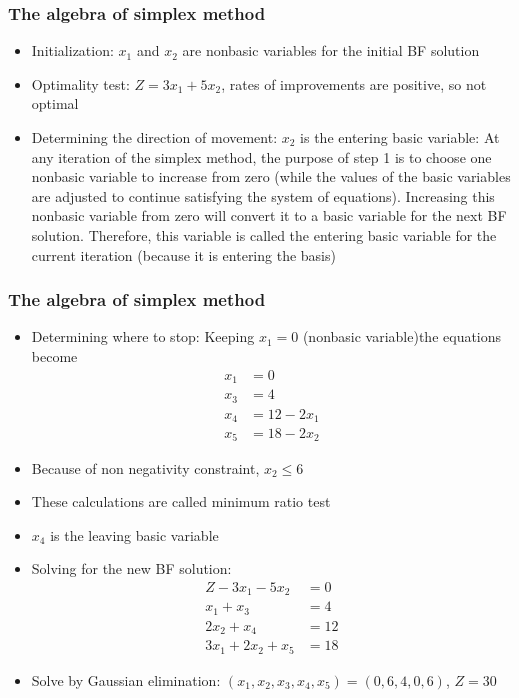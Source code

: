\documentclass[12pt]{article}
\begin{document}
  \subsubsection*{The algebra of simplex method}
  \begin{itemize}
  \item Initialization: $x_1$ and $x_2$ are nonbasic variables for the initial BF solution
  \item Optimality test: $Z=3 x_1 + 5 x_2$, rates of improvements are positive, so not optimal
  \item Determining the direction of movement: $x_2$ is the entering basic variable:
At any iteration of the simplex method, the purpose of step 1 is to choose one nonbasic
variable to increase from zero (while the values of the basic variables are adjusted to continue satisfying the system of equations). Increasing this nonbasic variable from zero will
convert it to a basic variable for the next BF solution. Therefore, this variable is called
the entering basic variable for the current iteration (because it is entering the basis)
  \end{itemize}


  \subsubsection*{The algebra of simplex method}
  \begin{itemize}
  \item Determining where to stop: Keeping $x_1=0$ (nonbasic variable)the equations become
    \begin{align*}
      x_1 &= 0 \\
      x_3 &= 4 \\
      x_4 &= 12 - 2 x_1 \\
      x_5 &= 18 - 2 x_2 
    \end{align*}
  \item Because of non negativity constraint, $x_2 \le 6$
  \item These calculations are called minimum ratio test
  \item $x_4$ is the leaving basic variable
  \end{itemize}



  \begin{itemize}
  \item Solving for the new BF solution:
    \begin{align*}
      Z-3 x_1-5 x_2       & = 0  \\
      x_1+x_3             & = 4  \\
      2 x_2 + x_4         & = 12 \\
      3 x_1 + 2 x_2 + x_5 & = 18 
    \end{align*}
\item Solve by Gaussian elimination: $(x_1,x_2,x_3,x_4,x_5) = (0,6,4,0,6)$, $Z=30$
  \end{itemize}
\end{document}
